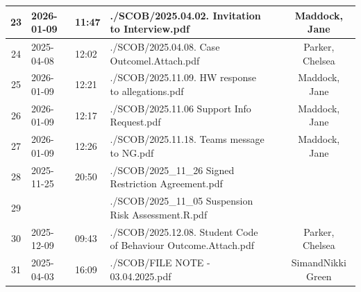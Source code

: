 \begin{landscape}
\begin{tabularx}{\linewidth}{|c|l|l|X|c|c|}
		23                               & 2026-01-09          & 11:47          & ./SCOB/2025.04.02. Invitation to Interview.pdf                                                                         &                         & Maddock, Jane            \\ \hline
		24                               & 2025-04-08          & 12:02          & ./SCOB/2025.04.08. Case Outcomel.Attach.pdf                                                                            &                         & Parker, Chelsea          \\ \hline
		25                               & 2026-01-09          & 12:21          & ./SCOB/2025.11.09. HW response to allegations.pdf                                                                      &                         & Maddock, Jane            \\ \hline
		26                               & 2026-01-09          & 12:17          & ./SCOB/2025.11.06 Support Info Request.pdf                                                                             &                         & Maddock, Jane            \\ \hline
		27                               & 2026-01-09          & 12:26          & ./SCOB/2025.11.18. Teams message to NG.pdf                                                                             &                         & Maddock, Jane            \\ \hline
		28                               & 2025-11-25          & 20:50          & ./SCOB/2025\_11\_26 Signed Restriction Agreement.pdf                                                                   &                         &                          \\ \hline
		29                               &                     &                & ./SCOB/2025\_11\_05 Suspension Risk Assessment.R.pdf                                                                   &                         &                          \\ \hline
		30                               & 2025-12-09          & 09:43          & ./SCOB/2025.12.08. Student Code of Behaviour Outcome.Attach.pdf                                                        &                         & Parker, Chelsea          \\ \hline
		31                               & 2025-04-03          & 16:09          & ./SCOB/FILE NOTE - 03.04.2025.pdf                                                                                      &                         & SimandNikki Green        \\ \hline

\end{tabularx}
\end{landscape}

